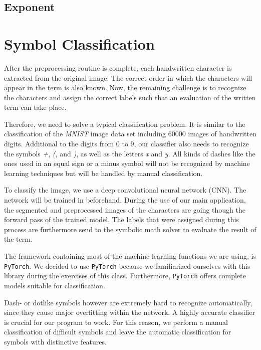 \documentclass[12pt]{article}
\begin{document}
	\subsection{Exponent}
	
	
\section{Symbol Classification}
After the preprocessing routine is complete, each handwritten character is extracted from the original image. The correct order in which the characters will appear in the term is also known. Now, the remaining challenge is to recognize the characters and assign the correct labels such that an evaluation of the written term can take place.
	
	Therefore, we need to solve a typical classification problem. It is similar to the classification of the \textit{MNIST} image data set including 60000 images of handwritten digits. Additional to the digits from 0 to 9, our classifier also needs to recognize the symbols \textit{+}, \textit{(}, and \textit{)}, as well as the letters \textit{x} and \textit{y}. All kinds of dashes like the ones used in an equal sign or a minus symbol will not be recognized by machine learning techniques but will be handled by manual classification.
	
	To classify the image, we use a deep convolutional neural network (CNN). The network will be trained in beforehand. During the use of our main application, the segmented and preprocessed images of the characters are going though the forward pass of the trained model. The labels that were assigned during this process are furthermore send to the symbolic math solver to evaluate the result of the term. 
	
	The framework containing most of the machine learning functions we are using, is \texttt{PyTorch}. We decided to use \texttt{PyTorch} because we familiarized ourselves with this library during the exercises of this class. Furthermore, \texttt{PyTorch} offers complete models suitable for classification.
		
	Dash- or dotlike symbols however are extremely hard to recognize automatically, since they cause major overfitting within the network. A highly accurate classifier is crucial for our program to work. For this reason, we perform a manual classification of difficult symbols and leave the automatic classification for symbols with distinctive features.
	
\end{document}
